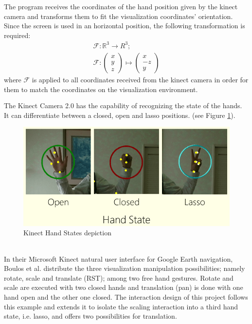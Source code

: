 \documentclass[12pt]{extarticle}
\newcommand{\R}{\mathbb{R}}
\begin{document}
The program receives the coordinates of the hand position given by the kinect camera and transforms them to fit the visualization coordinates' orientation. Since the screen is used in an horizontal position, the following transformation is required:
$$\begin{array}{c}
\mathcal F: \R^3\to R^3; \\
\mathcal F:\begin{pmatrix} x\\y\\z\end{pmatrix}\mapsto \begin{pmatrix} x\\-z\\y\end{pmatrix}\end{array}$$
where $\mathcal F$ is applied to all coordinates received from the kinect camera in order for them to match the coordinates on the visualization environment.

The Kinect Camera 2.0 has the capability of recognizing the state of the hands. It can differentiate between a closed, open and lasso positions. (see Figure \ref{fig: OCL}).
\begin{figure}[h!]
\includegraphics[scale=0.5]{Images/HandStates.png}
\caption{Kinect Hand States depiction}
\label{fig: OCL}
\end{figure}\\
In their Microsoft Kinect natural user interface for Google Earth navigation, Boulos et al. \cite{Kinoogle} distribute the three visualization manipulation possibilities; namely rotate, scale and translate (RST); among two free hand gestures. Rotate and scale are executed with two closed hands and translation (pan) is done with one hand open and the other one closed. The interaction design of this project follows this example and extends it to isolate the scaling interaction into a third hand state, i.e. lasso, and offers two possibilities for translation.
\end{document}
